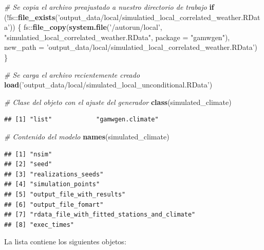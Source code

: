 \documentclass[
  12pt]{article}
\newenvironment{Shaded}{}{}
\newcommand{\CommentTok}[1]{\textcolor[rgb]{0.38,0.63,0.69}{\textit{#1}}}
\newcommand{\ControlFlowTok}[1]{\textcolor[rgb]{0.00,0.44,0.13}{\textbf{#1}}}
\newcommand{\DataTypeTok}[1]{\textcolor[rgb]{0.56,0.13,0.00}{#1}}
\newcommand{\KeywordTok}[1]{\textcolor[rgb]{0.00,0.44,0.13}{\textbf{#1}}}
\newcommand{\NormalTok}[1]{#1}
\newcommand{\OperatorTok}[1]{\textcolor[rgb]{0.40,0.40,0.40}{#1}}
\newcommand{\StringTok}[1]{\textcolor[rgb]{0.25,0.44,0.63}{#1}}
\begin{document}
\begin{Shaded}
\begin{Highlighting}[]
\CommentTok{# Se copia el archivo preajustado a nuestro directorio de trabajo}
\ControlFlowTok{if}\NormalTok{ (}\OperatorTok{!}\NormalTok{fs}\OperatorTok{::}\KeywordTok{file_exists}\NormalTok{(}\StringTok{'output_data/local/simulatied_local_correlated_weather.RData'}\NormalTok{)) \{}
\NormalTok{  fs}\OperatorTok{::}\KeywordTok{file_copy}\NormalTok{(}\KeywordTok{system.file}\NormalTok{(}\StringTok{'/autorun/local'}\NormalTok{,}
                            \StringTok{"simulatied_local_correlated_weather.RData"}\NormalTok{,  }\DataTypeTok{package =} \StringTok{"gamwgen"}\NormalTok{),}
        \DataTypeTok{new_path =} \StringTok{'output_data/local/simulatied_local_correlated_weather.RData'}\NormalTok{)}
\NormalTok{\}  }

\CommentTok{# Se carga el archivo recientemente creado}
\KeywordTok{load}\NormalTok{(}\StringTok{'output_data/local/simulated_local_unconditional.RData'}\NormalTok{)}

\CommentTok{# Clase del objeto con el ajuste del generador}
\KeywordTok{class}\NormalTok{(simulated_climate)}
\end{Highlighting}
\end{Shaded}

\begin{verbatim}
## [1] "list"            "gamwgen.climate"
\end{verbatim}

\begin{Shaded}
\begin{Highlighting}[]
\CommentTok{# Contenido del modelo }
\KeywordTok{names}\NormalTok{(simulated_climate)}
\end{Highlighting}
\end{Shaded}

\begin{verbatim}
## [1] "nsim"                                       
## [2] "seed"                                       
## [3] "realizations_seeds"                         
## [4] "simulation_points"                          
## [5] "output_file_with_results"                   
## [6] "output_file_fomart"                         
## [7] "rdata_file_with_fitted_stations_and_climate"
## [8] "exec_times"
\end{verbatim}

La lista contiene los siguientes objetos:
\end{document}
